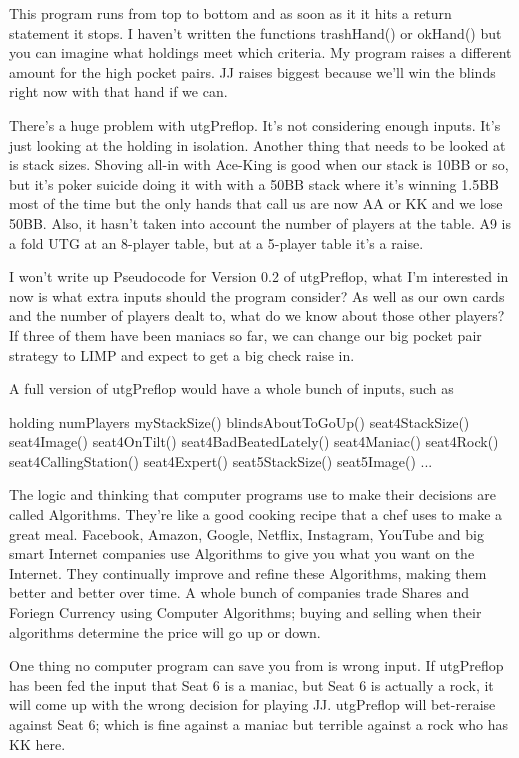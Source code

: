 This program runs from top to bottom and as soon as it it hits a
return statement it stops. I haven't written the functions
trashHand() or okHand() but you can imagine what holdings
meet which criteria. My program raises a different amount
for the high pocket pairs. JJ raises biggest because we'll win the
blinds right now with that hand if we can.

There's a huge problem with utgPreflop. It's not considering enough
inputs. It's just looking at the holding in isolation. Another thing
that needs to be looked at is stack sizes. Shoving all-in with
Ace-King is good when our stack is 10BB or so, but it's poker suicide
doing it with with a 50BB stack where it's winning 1.5BB most of the
time but the only hands that call us are now AA or KK and we lose 50BB.
Also, it hasn't taken into account the number of players at
the table. A9 is a fold UTG at an 8-player table, but at a 5-player
table it's a raise.

I won't write up Pseudocode for Version 0.2 of utgPreflop, what I'm
interested in now is what extra inputs should the program consider?
As well as our own cards and the number of players dealt to, what do
we know about those other players? If three of them have been maniacs
so far, we can change our big pocket pair strategy to LIMP and expect
to get a big check raise in.

A full version of utgPreflop would have a whole bunch of inputs, such
as

holding
numPlayers
myStackSize()
blindsAboutToGoUp()
seat4StackSize()
seat4Image()
seat4OnTilt()
seat4BadBeatedLately()
seat4Maniac()
seat4Rock()
seat4CallingStation()
seat4Expert()
seat5StackSize()
seat5Image()
...

The logic and thinking that computer programs use to
make their decisions are called Algorithms. They're like a good
cooking recipe that a chef uses to make a great meal. Facebook,
Amazon, Google, Netflix, Instagram, YouTube and big smart Internet
companies use Algorithms to give you what you want on the Internet.
They continually improve and refine these Algorithms, making them
better and better over time. A whole bunch of companies trade Shares
and Foriegn Currency using Computer Algorithms; buying and selling
when their algorithms determine the price will go up or down.


One thing no computer program can save you from is wrong input.
If utgPreflop has been fed the input that Seat 6 is a maniac,
but Seat 6 is actually a rock, it will come up with the wrong decision
for playing JJ. utgPreflop will bet-reraise against Seat 6; which is
fine against a maniac but terrible against a rock who has KK here.

